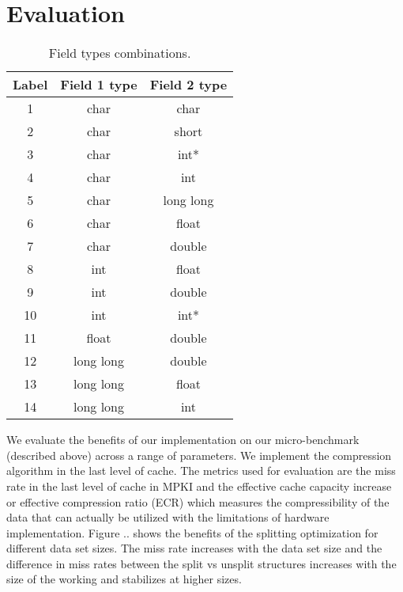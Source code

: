 \section{Evaluation}
\label{sec:eval}

\begin{table}[htb]
\centering
\begin{tabular}{ccc}
\toprule
Label & Field 1 type & Field 2 type \\
\midrule
1 & char & char \\
2 & char & short \\
3 & char & int* \\
4 & char & int \\
5 & char & long long \\
6 & char & float \\
7 & char & double \\
8 & int & float \\
9 & int & double \\
10 & int & int* \\
11 & float & double \\
12 & long long & double \\
13 & long long & float \\
14 & long long & int \\
\bottomrule
\end{tabular}
\caption{Field types combinations.}
\label{tbl:field-combinations}
\end{table}

We evaluate the benefits of our implementation on our micro-benchmark (described above) across a range of parameters. We implement the compression algorithm in the last level of cache. The metrics used for evaluation are the miss rate in the last level of cache in MPKI and the effective cache capacity increase or effective compression ratio (ECR) which measures the compressibility of the data that can actually be utilized with the limitations of hardware implementation. Figure .. shows the benefits of the splitting optimization for different data set sizes. The miss rate increases with the data set size and the difference in miss rates between the split vs unsplit structures increases with the size of the working and stabilizes at higher sizes.  

